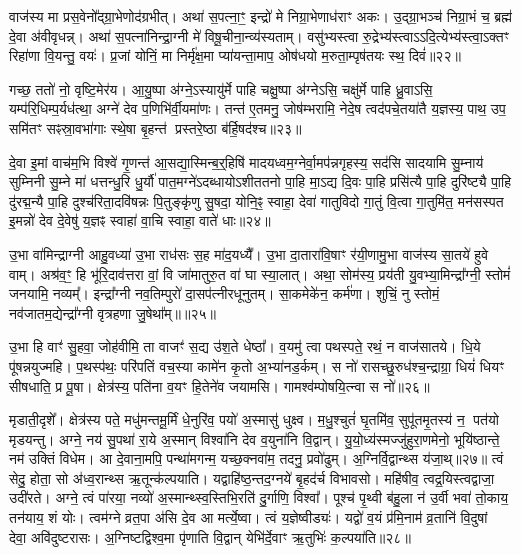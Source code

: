 {\anuvakamend[{अह्रु॑त॒ एक॑विꣳशतिश्च। (12)}]}

वाज॑स्य मा प्रस॒वेनो᳚द्ग्रा॒भेणोद॑ग्रभीत्। अथा॑ स॒पत्ना॒ꣳ॒ इन्द्रो॑ मे निग्रा॒भेणाध॑राꣳ अकः। उ॒द्ग्रा॒भञ्च॑ निग्रा॒भं च॒ ब्रह्म॑ दे॒वा अ॑वीवृधन्न्। अथा॑ स॒पत्ना॑निन्द्रा॒ग्नी मे॑ विषू॒चीना॒न्व्य॑स्यताम्। वसु॑भ्यस्त्वा रु॒द्रेभ्य॑स्त्वा\-ऽ\-ऽदि॒त्येभ्य॑स्त्वा॒ऽक्तꣳ रिहा॑णा वि॒यन्तु॒ वयः॑। प्र॒जां योनिं॒ मा निर्मृ॑क्ष॒मा प्या॑यन्ता॒माप॒ ओष॑धयो म॒रुता॒म्पृष॑तयः स्थ॒ दिवं॑॥२२॥

गच्छ॒ ततो॑ नो॒ वृष्टि॒मेर॑य। आ॒यु॒ष्पा अ॑ग्ने॒\-ऽस्यायु॑र्मे पाहि चक्षु॒ष्पा अ॑ग्ने\-ऽसि॒ चक्षु॑र्मे पाहि ध्रु॒वा\-ऽसि॒ यम्प॑रि॒धिम्प॒र्यध॑त्था॒ अग्ने॑ देव प॒णिभि॑र्वी॒यमा॑णः। तन्त॑ ए॒तमनु॒ जोष॑म्भरामि॒ नेदे॒ष त्वद॑पचे॒तया॑तै य॒ज्ञस्य॒ पाथ॒ उप॒ समि॑तꣳ सꣴस्रा॒वभा॑गाः स्थे॒षा बृ॒हन्त॑ प्रस्तरे॒ष्ठा ब॑र्\mbox{}हि॒षद॑श्च॥२३॥

दे॒वा इ॒मां वाच॑म॒भि विश्वे॑ गृ॒णन्त॑ आ॒सद्या॒स्मिन्ब॒र्॒हिषि॑ मादयध्वम॒ग्नेर्वा॒मप॑न्नगृहस्य॒ सद॑सि सादयामि सु॒म्नाय॑ सुम्निनी सु॒म्ने मा॑ धत्तन्धु॒रि धु॒र्यौ॑ पात॒मग्ने॑\-ऽदब्धायो\-ऽशीततनो पा॒हि मा॒\-ऽद्य दि॒वः पा॒हि प्रसि॑त्यै पा॒हि दुरि॑ष्ट्यै पा॒हि दु॑रद्म॒न्यै पा॒हि दुश्च॑रिता॒दवि॑षन्नः पि॒तुङ्कृ॑णु सु॒षदा॒ योनि॒ꣴ॒ स्वाहा॒ देवा॑ गातुविदो गा॒तुं वि॒त्वा गा॒तुमि॑त॒ मन॑सस्पत इ॒मन्नो॑ देव दे॒वेषु॑ य॒ज्ञꣴ स्वाहा॑ वा॒चि स्वाहा॒ वाते॑ धाः॥२४॥

{\anuvakamend[{दिव॑ञ्च वि॒त्वा गा॒तुन्त्रयो॑दश च। (13)}]}

उ॒भा वा॑मिन्द्राग्नी आहु॒वध्या॑ उ॒भा राध॑सः स॒ह मा॑द॒यध्यै᳚। उ॒भा दा॒तारा॑वि॒षाꣳ र॑यी॒णामु॒भा वाज॑स्य सा॒तये॑ हुवे वाम्। अश्र॑व॒ꣳ॒ हि भू॑रि॒दाव॑त्तरा वां॒ वि जा॑मातुरु॒त वा॑ घा स्या॒लात्। अथा॒ सोम॑स्य॒ प्रय॑ती यु॒वभ्या॒मिन्द्रा᳚ग्नी॒ स्तोमं॑ जनयामि॒ नव्यम्᳚। इन्द्रा᳚ग्नी नव॒तिम्पुरो॑ दा॒सप॑त्नीरधूनुतम्। सा॒कमेके॑न॒ कर्म॑णा। शुचिं॒ नु स्तोमं॒ नव॑जातम॒द्येन्द्रा᳚ग्नी वृत्रहणा जु॒षेथा᳚म्॥॥२५॥

उ॒भा हि वाꣳ॑ सु॒हवा॒ जोह॑वीमि॒ ता वाजꣳ॑ स॒द्य उ॑श॒ते धेष्ठा᳚। व॒यमु॑ त्वा पथस्पते॒ रथं॒ न वाज॑सातये। धि॒ये पू॑षन्नयुज्महि। प॒थस्प॑थः॒ परि॑पतिं वच॒स्या कामे॑न कृ॒तो अ॒भ्या॑नड॒र्कम्। स नो॑ रासच्छु॒रुध॑श्च॒न्द्राग्रा॒ धियं॑ धियꣳ सीषधाति॒ प्र पू॒षा। क्षेत्र॑स्य॒ पति॑ना व॒यꣳ हि॒तेने॑व जयामसि। गामश्व॑म्पोषयि॒त्न्वा स नो॑॥२६॥

मृडाती॒दृशे᳚। क्षेत्र॑स्य पते॒ मधु॑मन्तमू॒र्मिं धे॒नुरि॑व॒ पयो॑ अ॒स्मासु॑ धुक्ष्व। म॒धु॒श्चुतं॑ घृ॒तमि॑व॒ सुपू॑तमृ॒तस्य॑ न॒ पत॑यो मृडयन्तु। अग्ने॒ नय॑ सु॒पथा॑ रा॒ये अ॒स्मान् विश्वा॑नि देव व॒युना॑नि वि॒द्वान्। यु॒यो॒ध्य॑स्मज्जु॑हुरा॒णमेनो॒ भूयि॑ष्ठान्ते॒ नम॑ उक्तिं विधेम। आ दे॒वाना॒मपि॒ पन्था॑मगन्म॒ यच्छ॒क्नवा॑म॒ तदनु॒ प्रवो॑ढुम्। अ॒ग्निर्वि॒द्वान्थ्स य॑जा॒थ्॥२७॥
त्वं 
सेदु॒ होता॒ सो अ॑ध्व॒रान्थ्स ऋ॒तून्क॑ल्पयाति। यद्वा\-हि॑ष्ठ॒न्तद॒ग्नये॑ बृ॒हद॑र्च विभावसो। महि॑षीव॒ त्वद्र॒यिस्त्वद्वाजा॒ उदी॑रते। अग्ने॒ त्वं पा॑रया॒ नव्यो॑ अ॒स्मान्थ्स्व॒स्तिभि॒रति॑ दु॒र्गाणि॒ विश्वा᳚। पूश्च॑ पृ॒थ्वी ब॑हु॒ला न॑ उ॒र्वी भवा॑ तो॒काय॒ तन॑याय॒ शं योः। त्वम॑ग्ने व्रत॒पा अ॑सि दे॒व आ मर्त्ये॒ष्वा। त्वं य॒ज्ञेष्वीड्यः॑। यद्वो॑ व॒यं प्र॑मि॒नाम॑ व्र॒तानि॑ वि॒दुषां देवा॒ अवि॑दुष्टरासः। अ॒ग्निष्टद्विश्व॒मा पृ॑णाति वि॒द्वान् येभि॑र्दे॒वाꣳ ऋ॒तुभिः॑ क॒ल्पया॑ति॥२८॥

